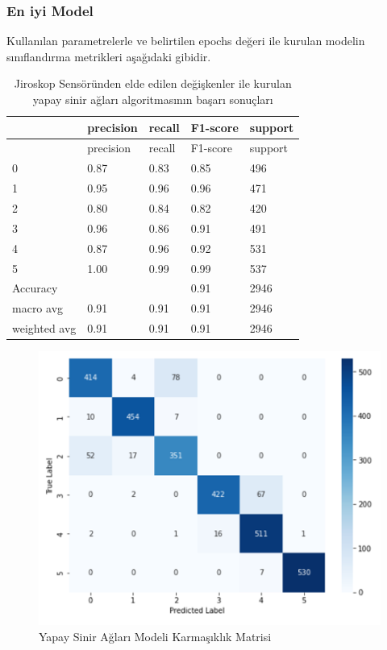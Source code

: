 \documentclass[12pt,twoside]{deuthesis}
\begin{document}
\hypertarget{en-iyi-model-4}{%
\subsubsection{En iyi Model}\label{en-iyi-model-4}}

Kullanılan parametrelerle ve belirtilen epochs değeri ile kurulan modelin sınıflandırma metrikleri aşağıdaki gibidir.
\begin{longtable}[]{@{}lllll@{}}
\caption{\label{tab:jysa} Jiroskop Sensöründen elde edilen değişkenler ile kurulan yapay sinir ağları algoritmasının başarı sonuçları}\tabularnewline
\toprule()
& precision & recall & F1-score & support \\
\midrule()
\endfirsthead
\toprule()
& precision & recall & F1-score & support \\
\midrule()
\endhead
0 & 0.87 & 0.83 & 0.85 & 496 \\
1 & 0.95 & 0.96 & 0.96 & 471 \\
2 & 0.80 & 0.84 & 0.82 & 420 \\
3 & 0.96 & 0.86 & 0.91 & 491 \\
4 & 0.87 & 0.96 & 0.92 & 531 \\
5 & 1.00 & 0.99 & 0.99 & 537 \\
Accuracy & & & 0.91 & 2946 \\
macro avg & 0.91 & 0.91 & 0.91 & 2946 \\
weighted avg & 0.91 & 0.91 & 0.91 & 2946 \\
\bottomrule()
\end{longtable}
\begin{figure}

{\centering \includegraphics[width=0.9\linewidth,height=0.35\textheight]{figure/ysa_confmat} 

}

\caption{Yapay Sinir Ağları Modeli Karmaşıklık Matrisi}\label{fig:ysaconfmat}
\end{figure}
\end{document}
